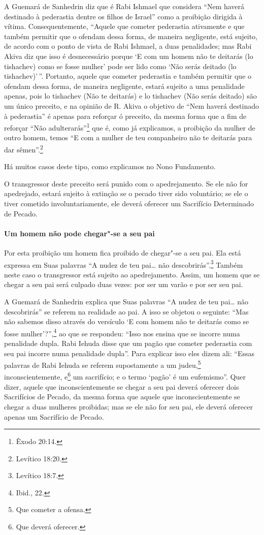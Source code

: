 \begin{multicols}{2}
A Guemará\starr{} de Sanhedrin\starr{} diz que é Rabi Ishmael\starr{} que considera ``Nem haverá
destinado à pederastia dentre os filhos de Israel'' como a proibição
dirigida à vítima. Consequentemente, ``Aquele que cometer pederastia
ativamente e que também permitir que o ofendam dessa forma, de maneira
negligente, está sujeito, de acordo com o ponto de vista de Rabi
Ishmael\starr, a duas penalidades; mas Rabi Akiva\starr{} diz que isso é
desnecessário porque `E com um homem não te deitarás (lo tishachev\starr) como
se fosse mulher' pode ser lido como `Não serás deitado (lo
tishachev\starr)'\,''. Portanto, aquele que cometer pederastia e também permitir que o ofendam dessa forma, de maneira negligente, estará
sujeito a uma penalidade apenas, pois lo tishachev\starr{} (Não te deitarás) e
lo tishachev\starr{} (Não serás deitado) são um único preceito, e na opinião
de R. Akiva\starr{} o objetivo de ``Nem haverá destinado à pederastia'' é apenas
para reforçar ó preceito, da mesma forma que a fim de reforçar ``Não
adulterarás''\footnote{Êxodo 20:14.} que é, como já explicamos, a proibição da
mulher de outro homem, temos ``E com a mulher de teu companheiro não te
deitarás para dar sêmen''.\footnote{Levítico 18:20.}

Há muitos casos deste tipo, como explicamos no Nono Fundamento.

O transgressor deste preceito será punido com o apedrejamento. Se ele
não for apedrejado, estará sujeito à extinção se o pecado tiver sido
voluntário; se ele o tiver cometido involuntariamente, ele deverá
oferecer um Sacrifício Determinado de Pecado.

\paragraph{Um homem não pode chegar"-se a seu pai}

Por esta proibição um homem fica proibido de chegar"-se a seu pai. Ela
está expressa em Suas palavras ``A nudez de teu pai\ldots{} não descobrirás''.\footnote{Levítico 18:7.} Também neste caso o transgressor está sujeito ao
apedrejamento. Assim, um homem que se chegar a seu pai será culpado duas
vezes: por ser um varão e por ser seu pai.

A Guemará\starr{} de Sanhedrin\starr{} explica que Suas palavras ``A nudez de teu pai\ldots{}
não descobrirás'' se referem na realidade ao pai. A isso se objetou o
seguinte: ``Mas não sabemos disso através do versículo `E com homem não
te deitarás como se fosse mulher'?'',\footnote{Ibid., 22.} ao que se respondeu:
``Isso nos ensina que se incorre numa penalidade dupla. Rabi Iehuda\starr{}
disse que um pagão que cometer pederastia com seu pai incorre numa
penalidade dupla''. Para explicar isso eles dizem ali: ``Essas palavras
de Rabi Iehuda\starr{} se referem supostamente a um judeu,\footnote{Que cometer a ofensa.}
inconscientemente, e\footnote{Que deverá oferecer.} um sacrifício; e o termo
`pagão' é um eufemismo''. Quer dizer, aquele que inconscientemente se
chegar a seu pai deverá oferecer dois Sacrifícios de Pecado, da mesma
forma que aquele que inconscientemente se chegar a duas mulheres
proibidas; mas se ele não for seu pai, ele deverá oferecer apenas um
Sacrifício de Pecado.


\end{multicols}
